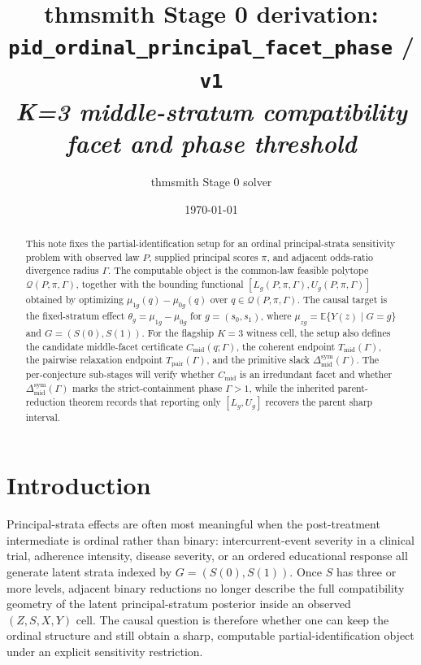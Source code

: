 \documentclass[11pt]{article}
\title{thmsmith Stage 0 derivation: \texttt{pid\_ordinal\_principal\_facet\_phase} / \texttt{v1}%
  \\ \large\textit{K=3 middle-stratum compatibility facet and phase threshold}}
\author{thmsmith Stage 0 solver}
\date{\today}
\newcommand{\E}{\mathbb{E}}
\theoremstyle{definition}
\theoremstyle{plain}
\theoremstyle{remark}
\begin{document}
\maketitle


\begin{abstract}
This note fixes the partial-identification setup for an ordinal principal-strata sensitivity problem with observed law \(P\), supplied principal scores \(\pi\), and adjacent odds-ratio divergence radius \(\Gamma\).  The computable object is the common-law feasible polytope \(\mathcal Q(P,\pi,\Gamma)\), together with the bounding functional \([L_g(P,\pi,\Gamma),U_g(P,\pi,\Gamma)]\) obtained by optimizing \(\mu_{1g}(q)-\mu_{0g}(q)\) over \(q\in\mathcal Q(P,\pi,\Gamma)\).  The causal target is the fixed-stratum effect \(\theta_g=\mu_{1g}-\mu_{0g}\) for \(g=(s_0,s_1)\), where \(\mu_{zg}=\E\{Y(z)\mid G=g\}\) and \(G=(S(0),S(1))\).  For the flagship \(K=3\) witness cell, the setup also defines the candidate middle-facet certificate \(C_{\mathrm{mid}}(q;\Gamma)\), the coherent endpoint \(T_{\mathrm{mid}}(\Gamma)\), the pairwise relaxation endpoint \(T_{\mathrm{pair}}(\Gamma)\), and the primitive slack \(\Delta_{\mathrm{mid}}^{\mathrm{sym}}(\Gamma)\).  The per-conjecture sub-stages will verify whether \(C_{\mathrm{mid}}\) is an irredundant facet and whether \(\Delta_{\mathrm{mid}}^{\mathrm{sym}}(\Gamma)\) marks the strict-containment phase \(\Gamma>1\), while the inherited parent-reduction theorem records that reporting only \([L_g,U_g]\) recovers the parent sharp interval.
\end{abstract}

\section{Introduction}
Principal-strata effects are often most meaningful when the post-treatment intermediate is ordinal rather than binary: intercurrent-event severity in a clinical trial, adherence intensity, disease severity, or an ordered educational response all generate latent strata indexed by \(G=(S(0),S(1))\).  Once \(S\) has three or more levels, adjacent binary reductions no longer describe the full compatibility geometry of the latent principal-stratum posterior inside an observed \((Z,S,X,Y)\) cell.  The causal question is therefore whether one can keep the ordinal structure and still obtain a sharp, computable partial-identification object under an explicit sensitivity restriction.
\end{document}
